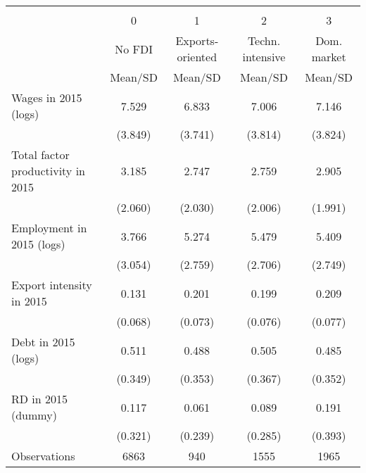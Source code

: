 {
\def\sym#1{\ifmmode^{#1}\else\(^{#1}\)\fi}
\begin{tabular}{l*{4}{c}}
\hline\hline
                    &\multicolumn{4}{c}{}                               \\
                    &           0&          1&           2&           3\\
                     &           No FDI&          Exports-oriented&           Techn. intensive&          Dom. market\\
                    &     Mean/SD&     Mean/SD&     Mean/SD&     Mean/SD\\
\hline
Wages in 2015 (logs)&       7.529&       6.833&       7.006&       7.146\\
                    &     (3.849)&     (3.741)&     (3.814)&     (3.824)\\
Total factor productivity in 2015&       3.185&       2.747&       2.759&       2.905\\
                    &     (2.060)&     (2.030)&     (2.006)&     (1.991)\\
Employment in 2015 (logs)&       3.766&       5.274&       5.479&       5.409\\
                    &     (3.054)&     (2.759)&     (2.706)&     (2.749)\\
Export intensity in 2015&       0.131&       0.201&       0.199&       0.209\\
                    &     (0.068)&     (0.073)&     (0.076)&     (0.077)\\
Debt in 2015 (logs) &       0.511&       0.488&       0.505&       0.485\\
                    &     (0.349)&     (0.353)&     (0.367)&     (0.352)\\
RD in 2015 (dummy)  &       0.117&       0.061&       0.089&       0.191\\
                    &     (0.321)&     (0.239)&     (0.285)&     (0.393)\\
\hline
Observations        &       6863&     940       &    1555        &    1965        \\
\hline\hline
\end{tabular}
}
